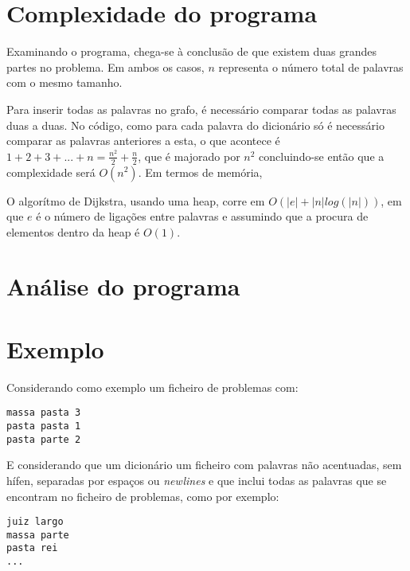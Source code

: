 \documentclass[a4paper, 11pt]{article}
\begin{document}
\section{Complexidade do programa}
    \par Examinando o programa, chega-se à conclusão de que existem duas grandes partes no problema. Em ambos os casos, $n$ representa o número total de palavras com o mesmo tamanho.
    \begin{description}[align=left]
        \item[Criação de grafo] Para inserir todas as palavras no grafo, é necessário comparar todas as palavras duas a duas. No código, como para cada palavra do dicionário só é necessário comparar as palavras anteriores a esta, o que acontece é $1 + 2 + 3 + ... + n = \frac{n^2}{2} + \frac{n}{2}$, que é majorado por $n^2$ concluindo-se então que a complexidade será $O(n^2)$.
        Em termos de memória, 
        \item[Algorítmo de Dijkstra] O algorítmo de Dijkstra, usando uma heap, corre em $O(|e| + |n|log(|n|))$, em que $e$ é o número de ligações entre palavras e assumindo que a procura de elementos dentro da heap é $O(1)$.
    \end{description}

\section{Análise do programa}

\section{Exemplo}
    \par Considerando como exemplo um ficheiro de problemas com:
        \begin{center}
        \texttt{massa pasta 3 \\
        pasta pasta 1 \\
        pasta parte 2 \\
        }
        \end{center}
        
    \par E considerando que um dicionário um ficheiro com palavras não acentuadas, sem hífen, separadas por espaços ou \textit{newlines} e que inclui todas as palavras que se encontram no ficheiro de problemas, como por exemplo: 
        \begin{center}
        \texttt{juiz largo \\
        massa parte \\
        pasta rei \\
        ...}
        \end{center}
        
\end{document}
